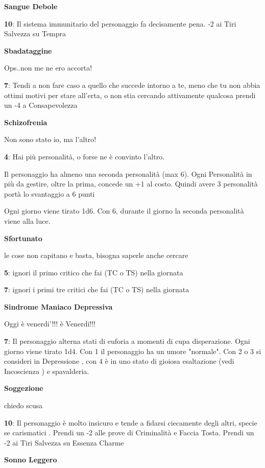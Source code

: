 \documentclass[a4paper,11pt,twoside,openany]{book}
\begin{document}
\textbf{Sangue Debole}

\textbf{10}: Il sistema immunitario del personaggio fa decisamente pena. -2 ai Tiri Salvezza su Tempra

\textbf{Sbadataggine}

Ops..non me ne ero accorta!

\textbf{7}: Tendi a non fare caso a quello che succede intorno a te, meno che tu non abbia ottimi motivi per stare all'erta, o non stia cercando attivamente qualcosa prendi un -4 a Consapevolezza

\textbf{Schizofrenia}

Non sono stato io, ma l'altro!

\textbf{4}: Hai più personalità, o forse ne è convinto l'altro.

Il personaggio ha almeno una seconda personalità (max 6).
Ogni Personalità in più da gestire, oltre la prima, concede un +1 al costo.
Quindi avere 3 personalità portà lo svantaggio a 6 punti

Ogni giorno viene tirato 1d6. Con 6, durante il giorno la seconda personalità viene alla luce.

\textbf{Sfortunato}

le cose non capitano e basta, bisogna saperle anche cercare

\textbf{5}: ignori il primo critico che fai (TC o TS) nella giornata

\textbf{7}: ignori i primi tre critici che fai (TC o TS) nella giornata

\textbf{Sindrome Maniaco Depressiva}

Oggi è venerdi'!!! è Venerdi!!!

\textbf{7}: Il personaggio alterna stati di euforia a momenti di cupa disperazione. Ogni giorno viene tirato 1d4. Con 1 il personaggio ha un umore "normale". Con 2 o 3 si consideri in Depressione , con 4 è in uno stato di gioiosa esaltazione (vedi Incoscienza ) e spavalderia.

\textbf{Soggezione}

chiedo scusa

\textbf{10}: Il personaggio è molto insicuro e tende a fidarsi ciecamente degli altri, specie se carismatici . Prendi un -2 alle prove di Criminalità e Faccia Tosta.
Prendi un -2 ai Tiri Salvezza su Essenza Charme

\textbf{Sonno Leggero}
\end{document}
